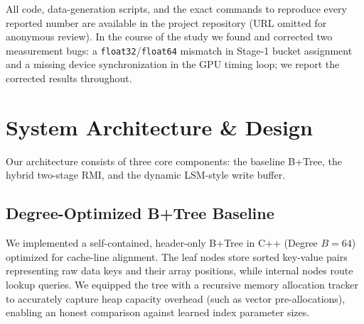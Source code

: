 \documentclass[sigconf,nonacm]{acmart}
\begin{document}
\noindent All code, data-generation scripts, and the exact commands to reproduce every reported number are available in the project repository (URL omitted for anonymous review). In the course of the study we found and corrected two measurement bugs: a \texttt{float32}/\texttt{float64} mismatch in Stage-1 bucket assignment and a missing device synchronization in the GPU timing loop; we report the corrected results throughout.

\section{System Architecture \& Design}
Our architecture consists of three core components: the baseline B+Tree, the hybrid two-stage RMI, and the dynamic LSM-style write buffer.

\subsection{Degree-Optimized B+Tree Baseline}
We implemented a self-contained, header-only B+Tree in C++ (Degree $B=64$) optimized for cache-line alignment. The leaf nodes store sorted key-value pairs representing raw data keys and their array positions, while internal nodes route lookup queries. We equipped the tree with a recursive memory allocation tracker to accurately capture heap capacity overhead (such as vector pre-allocations), enabling an honest comparison against learned index parameter sizes.
\end{document}
